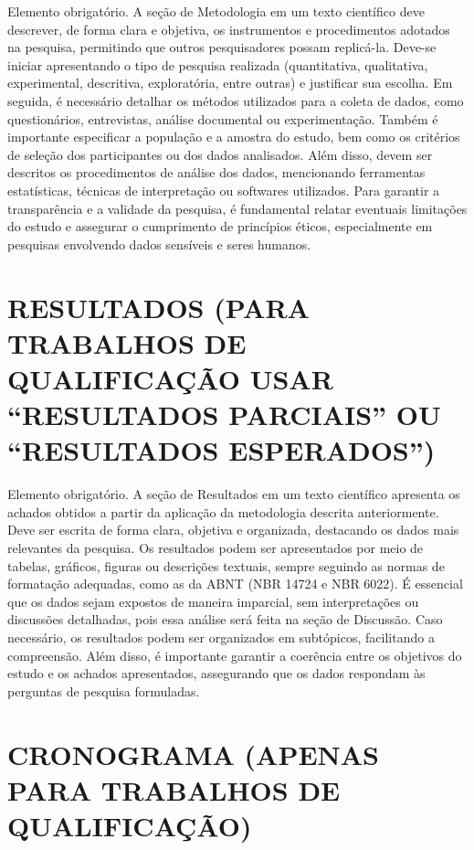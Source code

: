 \documentclass[
	article,
	12pt,
	oneside,
	a4paper,
	english,
	brazil,
	sumario=tradicional
]{abntex2}
\begin{document}
Elemento obrigatório. A seção de Metodologia em um texto científico deve descrever, de forma clara e objetiva, os instrumentos e procedimentos adotados na pesquisa, permitindo que outros pesquisadores possam replicá-la. Deve-se iniciar apresentando o tipo de pesquisa realizada (quantitativa, qualitativa, experimental, descritiva, exploratória, entre outras) e justificar sua escolha. Em seguida, é necessário detalhar os métodos utilizados para a coleta de dados, como questionários, entrevistas, análise documental ou experimentação. Também é importante especificar a população e a amostra do estudo, bem como os critérios de seleção dos participantes ou dos dados analisados. Além disso, devem ser descritos os procedimentos de análise dos dados, mencionando ferramentas estatísticas, técnicas de interpretação ou softwares utilizados. Para garantir a transparência e a validade da pesquisa, é fundamental relatar eventuais limitações do estudo e assegurar o cumprimento de princípios éticos, especialmente em pesquisas envolvendo dados sensíveis e seres humanos.

\section{\textbf{RESULTADOS (PARA TRABALHOS DE QUALIFICAÇÃO USAR “RESULTADOS PARCIAIS” OU “RESULTADOS ESPERADOS”)}}

Elemento obrigatório. A seção de Resultados em um texto científico apresenta os achados obtidos a partir da aplicação da metodologia descrita anteriormente. Deve ser escrita de forma clara, objetiva e organizada, destacando os dados mais relevantes da pesquisa. Os resultados podem ser apresentados por meio de tabelas, gráficos, figuras ou descrições textuais, sempre seguindo as normas de formatação adequadas, como as da ABNT (NBR 14724 e NBR 6022). É essencial que os dados sejam expostos de maneira imparcial, sem interpretações ou discussões detalhadas, pois essa análise será feita na seção de Discussão. Caso necessário, os resultados podem ser organizados em subtópicos, facilitando a compreensão. Além disso, é importante garantir a coerência entre os objetivos do estudo e os achados apresentados, assegurando que os dados respondam às perguntas de pesquisa formuladas.

\section{\textbf{CRONOGRAMA (APENAS PARA TRABALHOS DE QUALIFICAÇÃO)}}
\end{document}
